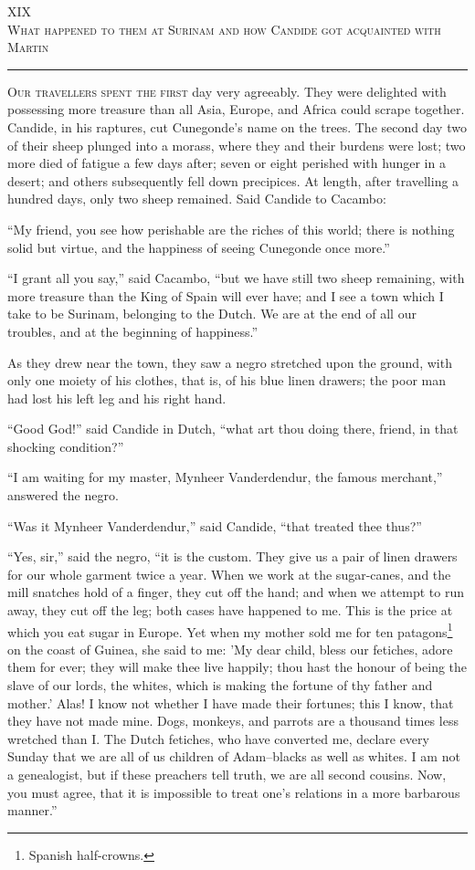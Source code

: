 \begin{center}
XIX\\
\textsc{What happened to them at Surinam and how Candide got acquainted with Martin}
\end{center}
\vspace{-0.5cm}
\rule{\textwidth}{0.5pt}
\lettrine{O}{ur travellers spent the first} day very agreeably. They were delighted with possessing more treasure than all Asia, Europe, and Africa could scrape together. Candide, in his raptures, cut Cunegonde's name on the trees. The second day two of their sheep plunged into a morass, where they and their burdens were lost; two more died of fatigue a few days after; seven or eight perished with hunger in a desert; and others subsequently fell down precipices. At length, after travelling a hundred days, only two sheep remained. Said Candide to Cacambo:

``My friend, you see how perishable are the riches of this world; there is nothing solid but virtue, and the happiness of seeing Cunegonde once more.''

``I grant all you say,'' said Cacambo, ``but we have still two sheep remaining, with more treasure than the King of Spain will ever have; and I see a town which I take to be Surinam, belonging to the Dutch. We are at the end of all our troubles, and at the beginning of happiness.''

As they drew near the town, they saw a negro stretched upon the ground, with only one moiety of his clothes, that is, of his blue linen drawers; the poor man had lost his left leg and his right hand.

``Good God!'' said Candide in Dutch, ``what art thou doing there, friend, in that shocking condition?''

``I am waiting for my master, Mynheer Vanderdendur, the famous merchant,'' answered the negro.

``Was it Mynheer Vanderdendur,'' said Candide, ``that treated thee thus?''

``Yes, sir,'' said the negro, ``it is the custom. They give us a pair of linen drawers for our whole garment twice a year. When we work at the sugar-canes, and the mill snatches hold of a finger, they cut off the hand; and when we attempt to run away, they cut off the leg; both cases have happened to me. This is the price at which you eat sugar in Europe. Yet when my mother sold me for ten patagons\footnote{Spanish half-crowns.} on the coast of Guinea, she said to me: 'My dear child, bless our fetiches, adore them for ever; they will make thee live happily; thou hast the honour of being the slave of our lords, the whites, which is making the fortune of thy father and mother.' Alas! I know not whether I have made their fortunes; this I know, that they have not made mine. Dogs, monkeys, and parrots are a thousand times less wretched than I. The Dutch fetiches, who have converted me, declare every Sunday that we are all of us children of Adam--blacks as well as whites. I am not a genealogist, but if these preachers tell truth, we are all second cousins. Now, you must agree, that it is impossible to treat one's relations in a more barbarous manner.''

